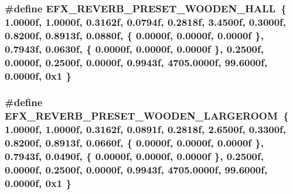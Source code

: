 \subsubsection[{\texorpdfstring{E\+F\+X\+\_\+\+R\+E\+V\+E\+R\+B\+\_\+\+P\+R\+E\+S\+E\+T\+\_\+\+W\+O\+O\+D\+E\+N\+\_\+\+H\+A\+LL}{EFX_REVERB_PRESET_WOODEN_HALL}}]{\setlength{\rightskip}{0pt plus 5cm}\#define E\+F\+X\+\_\+\+R\+E\+V\+E\+R\+B\+\_\+\+P\+R\+E\+S\+E\+T\+\_\+\+W\+O\+O\+D\+E\+N\+\_\+\+H\+A\+LL~\{ 1.\+0000f, 1.\+0000f, 0.\+3162f, 0.\+0794f, 0.\+2818f, 3.\+4500f, 0.\+3000f, 0.\+8200f, 0.\+8913f, 0.\+0880f, \{ 0.\+0000f, 0.\+0000f, 0.\+0000f \}, 0.\+7943f, 0.\+0630f, \{ 0.\+0000f, 0.\+0000f, 0.\+0000f \}, 0.\+2500f, 0.\+0000f, 0.\+2500f, 0.\+0000f, 0.\+9943f, 4705.\+0000f, 99.\+6000f, 0.\+0000f, 0x1 \}}\hypertarget{efx-presets_8h_a15b475fde8954f5094393b00533d6684}{}\label{efx-presets_8h_a15b475fde8954f5094393b00533d6684}
\subsubsection[{\texorpdfstring{E\+F\+X\+\_\+\+R\+E\+V\+E\+R\+B\+\_\+\+P\+R\+E\+S\+E\+T\+\_\+\+W\+O\+O\+D\+E\+N\+\_\+\+L\+A\+R\+G\+E\+R\+O\+OM}{EFX_REVERB_PRESET_WOODEN_LARGEROOM}}]{\setlength{\rightskip}{0pt plus 5cm}\#define E\+F\+X\+\_\+\+R\+E\+V\+E\+R\+B\+\_\+\+P\+R\+E\+S\+E\+T\+\_\+\+W\+O\+O\+D\+E\+N\+\_\+\+L\+A\+R\+G\+E\+R\+O\+OM~\{ 1.\+0000f, 1.\+0000f, 0.\+3162f, 0.\+0891f, 0.\+2818f, 2.\+6500f, 0.\+3300f, 0.\+8200f, 0.\+8913f, 0.\+0660f, \{ 0.\+0000f, 0.\+0000f, 0.\+0000f \}, 0.\+7943f, 0.\+0490f, \{ 0.\+0000f, 0.\+0000f, 0.\+0000f \}, 0.\+2500f, 0.\+0000f, 0.\+2500f, 0.\+0000f, 0.\+9943f, 4705.\+0000f, 99.\+6000f, 0.\+0000f, 0x1 \}}\hypertarget{efx-presets_8h_aad9a3b46b19e2f641fd3cabe2e477ab6}{}\label{efx-presets_8h_aad9a3b46b19e2f641fd3cabe2e477ab6}
